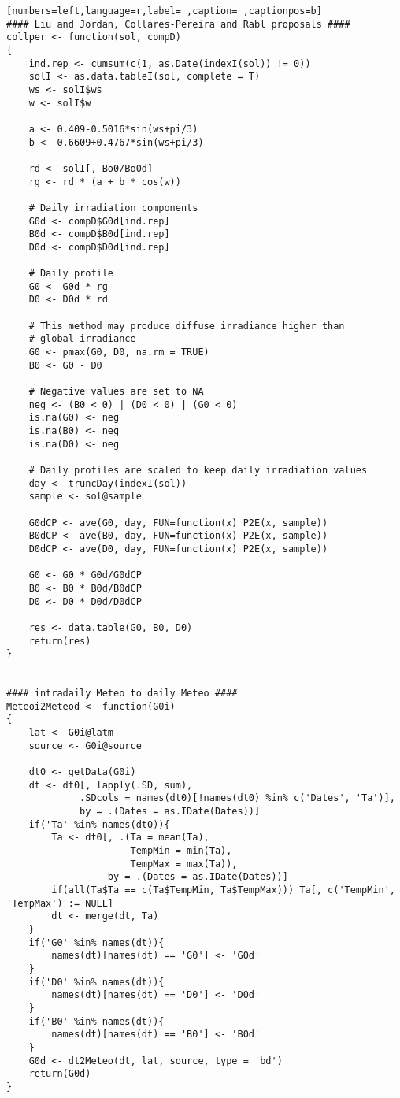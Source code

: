 \begin{lstlisting}[numbers=left,language=r,label= ,caption= ,captionpos=b]
#### Liu and Jordan, Collares-Pereira and Rabl proposals ####
collper <- function(sol, compD)
{
    ind.rep <- cumsum(c(1, as.Date(indexI(sol)) != 0))
    solI <- as.data.tableI(sol, complete = T)
    ws <- solI$ws
    w <- solI$w

    a <- 0.409-0.5016*sin(ws+pi/3)
    b <- 0.6609+0.4767*sin(ws+pi/3)

    rd <- solI[, Bo0/Bo0d]
    rg <- rd * (a + b * cos(w))

    # Daily irradiation components
    G0d <- compD$G0d[ind.rep]
    B0d <- compD$B0d[ind.rep]
    D0d <- compD$D0d[ind.rep]

    # Daily profile
    G0 <- G0d * rg
    D0 <- D0d * rd

    # This method may produce diffuse irradiance higher than
    # global irradiance
    G0 <- pmax(G0, D0, na.rm = TRUE)
    B0 <- G0 - D0

    # Negative values are set to NA
    neg <- (B0 < 0) | (D0 < 0) | (G0 < 0)
    is.na(G0) <- neg
    is.na(B0) <- neg
    is.na(D0) <- neg

    # Daily profiles are scaled to keep daily irradiation values
    day <- truncDay(indexI(sol))
    sample <- sol@sample

    G0dCP <- ave(G0, day, FUN=function(x) P2E(x, sample))
    B0dCP <- ave(B0, day, FUN=function(x) P2E(x, sample))
    D0dCP <- ave(D0, day, FUN=function(x) P2E(x, sample))

    G0 <- G0 * G0d/G0dCP
    B0 <- B0 * B0d/B0dCP
    D0 <- D0 * D0d/D0dCP

    res <- data.table(G0, B0, D0)
    return(res)
}


#### intradaily Meteo to daily Meteo ####
Meteoi2Meteod <- function(G0i)
{
    lat <- G0i@latm
    source <- G0i@source

    dt0 <- getData(G0i)
    dt <- dt0[, lapply(.SD, sum), 
             .SDcols = names(dt0)[!names(dt0) %in% c('Dates', 'Ta')],
             by = .(Dates = as.IDate(Dates))]
    if('Ta' %in% names(dt0)){
        Ta <- dt0[, .(Ta = mean(Ta),
                      TempMin = min(Ta),
                      TempMax = max(Ta)),
                  by = .(Dates = as.IDate(Dates))]
        if(all(Ta$Ta == c(Ta$TempMin, Ta$TempMax))) Ta[, c('TempMin', 'TempMax') := NULL]
        dt <- merge(dt, Ta)
    }
    if('G0' %in% names(dt)){
        names(dt)[names(dt) == 'G0'] <- 'G0d'
    }
    if('D0' %in% names(dt)){
        names(dt)[names(dt) == 'D0'] <- 'D0d'
    }
    if('B0' %in% names(dt)){
        names(dt)[names(dt) == 'B0'] <- 'B0d'
    }
    G0d <- dt2Meteo(dt, lat, source, type = 'bd')
    return(G0d)
}


\end{lstlisting}
